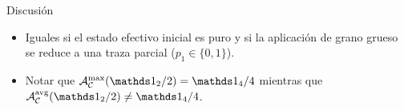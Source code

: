 \begin{frame}{Discusión}
\begin{itemize}
    \item Iguales si el estado efectivo inicial es puro y si la aplicación de grano grueso se reduce a una traza parcial ($p_{1}\in\{0,1\}$).
    \item Notar que $\mcA_{\mcC}^{\max}(\Id_{2}/2)=\Id_{4}/4$ mientras que $\mcA_{\mcC}^{\avg}(\Id_{2}/2)\neq\Id_{4}/4$.
\end{itemize}
\end{frame}
